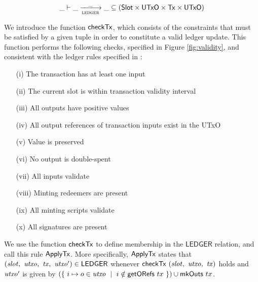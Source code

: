   \begin{equation*}
    \_ \vdash
    \var{\_} \trans{ledger}{\_} \var{\_}
    \subseteq (\Slot \times \UTxO \times \Tx \times \UTxO)
  \end{equation*}

We introduce the function $\mathsf{checkTx}$, which
consists of the constraints that must be satisfied by a given tuple
in order to constitute a valid ledger update. This function performs the following
checks, specified in Figure \ref{fig:validity}, and consistent with the ledger rules
specified in \cite{eutxoma} \cite{structured} :

\begin{itemize}
  \item[(i)] The transaction has at least one input
  \item[(ii)] The current slot is within transaction validity interval
  \item[(iii)] All outputs have positive values
  \item[(iv)] All output references of transaction inputs exist in the UTxO
  \item[(v)] Value is preserved
  \item[(vi)] No output is double-spent
  \item[(vii)] All inputs validate
  \item[(viii)] Minting redeemers are present
  \item[(ix)] All minting scripts validate
  \item[(x)] All signatures are present
\end{itemize}

We use the function $\mathsf{checkTx}$ to define membership in the
$\mathsf{LEDGER}$ relation, and call this rule $\mathsf{ApplyTx}$.
More specifically, $\mathsf{ApplyTx}$ states that
$(\mathit{slot},~\mathit{utxo},~\mathit{tx},~\mathit{utxo'}) \in \mathsf{LEDGER}$
whenever $\mathsf{checkTx}~(\mathit{slot},~\mathit{utxo},~\mathit{tx})$ holds and $\mathit{utxo'}$
is given by $(\{~i\mapsto o \in \mathit{utxo} ~\mid~ i \notin \mathsf{getORefs}~{tx}~\}) \cup \mathsf{mkOuts}~{tx} $.

